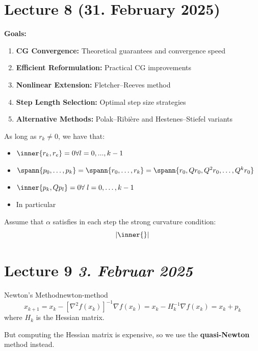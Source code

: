 \section{Lecture 8 (31. February 2025)}

\textbf{Goals:}
\begin{enumerate}
	\item \textbf{CG Convergence:} Theoretical guarantees and convergence speed
	\item \textbf{Efficient Reformulation:} Practical CG improvements
	\item \textbf{Nonlinear Extension:} Fletcher--Reeves method
	\item \textbf{Step Length Selection:} Optimal step size strategies
	\item \textbf{Alternative Methods:} Polak--Ribière and Hestenes--Stiefel variants
\end{enumerate}

\begin{theorem}{}{}
	As long as \(r_k \neq 0\), we have that:
	\begin{itemize}
		\item \(\inner{r_k, r_e}=0 \forall l = 0,...,k-1 \)
		\item \(\spann\{p_0,\ldots, p_k\} = \spann\{r_0, \ldots, r_k\} = \spann\{r_0, Qr_0, Q^2r_0,\ldots, Q^k r_0\}\)
		\item \(\inner\{p_k, Qp_l\} = 0 \forall \; l=0,\ldots,k-1\)
		\item In particular
	\end{itemize}
\end{theorem}

\begin{lemma}{}{}
	Assume that \(\alpha\) satisfies in each step the strong curvature condition:
	\[
		\left|\inner{}\right|
	\]
\end{lemma}

\section{Lecture 9 \emph{3. Februar 2025}}

\begin{definition}{Newton's Method}{newton-method}
	\[
		x_{k+1} = x_k - [\nabla^2 f(x_k)]^{-1} \nabla f(x_k) = x_k - H_k^{-1} \nabla f(x_k) = x_k + p_k
	\]
	where \( H_k \) is the Hessian matrix.
\end{definition}

But computing the Hessian matrix is expensive, so we use the \textbf{quasi-Newton} method instead.

